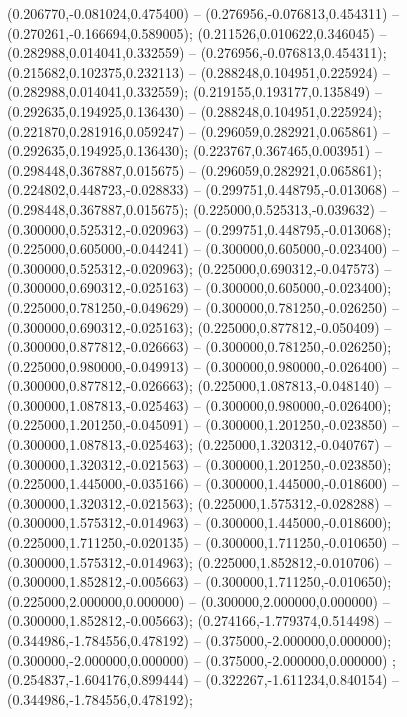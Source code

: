  (0.206770,-0.081024,0.475400) -- (0.276956,-0.076813,0.454311) -- (0.270261,-0.166694,0.589005);
 (0.211526,0.010622,0.346045) -- (0.282988,0.014041,0.332559) -- (0.276956,-0.076813,0.454311);
 (0.215682,0.102375,0.232113) -- (0.288248,0.104951,0.225924) -- (0.282988,0.014041,0.332559);
 (0.219155,0.193177,0.135849) -- (0.292635,0.194925,0.136430) -- (0.288248,0.104951,0.225924);
 (0.221870,0.281916,0.059247) -- (0.296059,0.282921,0.065861) -- (0.292635,0.194925,0.136430);
 (0.223767,0.367465,0.003951) -- (0.298448,0.367887,0.015675) -- (0.296059,0.282921,0.065861);
 (0.224802,0.448723,-0.028833) -- (0.299751,0.448795,-0.013068) -- (0.298448,0.367887,0.015675);
 (0.225000,0.525313,-0.039632) -- (0.300000,0.525312,-0.020963) -- (0.299751,0.448795,-0.013068);
 (0.225000,0.605000,-0.044241) -- (0.300000,0.605000,-0.023400) -- (0.300000,0.525312,-0.020963);
 (0.225000,0.690312,-0.047573) -- (0.300000,0.690312,-0.025163) -- (0.300000,0.605000,-0.023400);
 (0.225000,0.781250,-0.049629) -- (0.300000,0.781250,-0.026250) -- (0.300000,0.690312,-0.025163);
 (0.225000,0.877812,-0.050409) -- (0.300000,0.877812,-0.026663) -- (0.300000,0.781250,-0.026250);
 (0.225000,0.980000,-0.049913) -- (0.300000,0.980000,-0.026400) -- (0.300000,0.877812,-0.026663);
 (0.225000,1.087813,-0.048140) -- (0.300000,1.087813,-0.025463) -- (0.300000,0.980000,-0.026400);
 (0.225000,1.201250,-0.045091) -- (0.300000,1.201250,-0.023850) -- (0.300000,1.087813,-0.025463);
 (0.225000,1.320312,-0.040767) -- (0.300000,1.320312,-0.021563) -- (0.300000,1.201250,-0.023850);
 (0.225000,1.445000,-0.035166) -- (0.300000,1.445000,-0.018600) -- (0.300000,1.320312,-0.021563);
 (0.225000,1.575312,-0.028288) -- (0.300000,1.575312,-0.014963) -- (0.300000,1.445000,-0.018600);
 (0.225000,1.711250,-0.020135) -- (0.300000,1.711250,-0.010650) -- (0.300000,1.575312,-0.014963);
 (0.225000,1.852812,-0.010706) -- (0.300000,1.852812,-0.005663) -- (0.300000,1.711250,-0.010650);
 (0.225000,2.000000,0.000000) -- (0.300000,2.000000,0.000000) -- (0.300000,1.852812,-0.005663);
 (0.274166,-1.779374,0.514498) -- (0.344986,-1.784556,0.478192) -- (0.375000,-2.000000,0.000000);
 (0.300000,-2.000000,0.000000) -- (0.375000,-2.000000,0.000000) ;
 (0.254837,-1.604176,0.899444) -- (0.322267,-1.611234,0.840154) -- (0.344986,-1.784556,0.478192);
